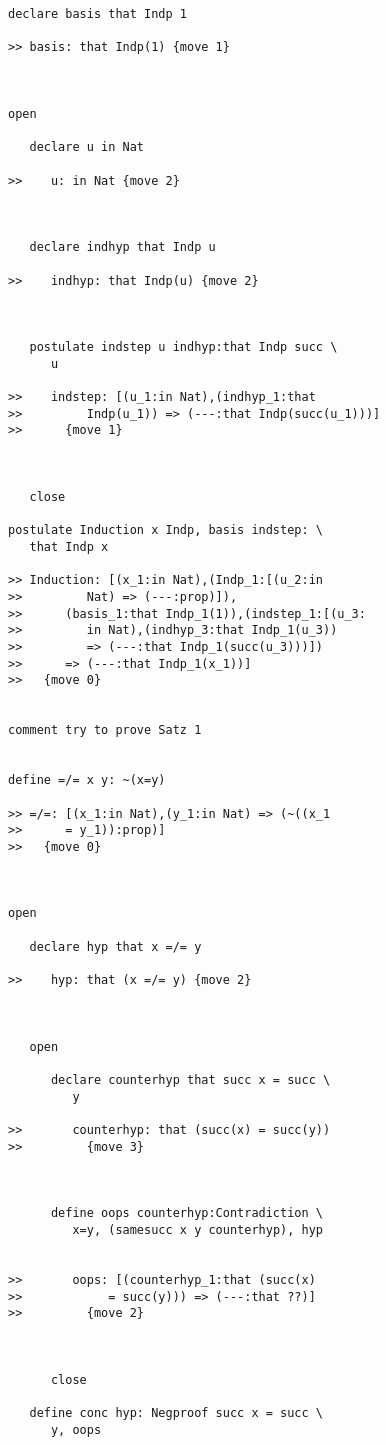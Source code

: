 \begin{verbatim}
declare basis that Indp 1

>> basis: that Indp(1) {move 1}



open

   declare u in Nat

>>    u: in Nat {move 2}



   declare indhyp that Indp u

>>    indhyp: that Indp(u) {move 2}



   postulate indstep u indhyp:that Indp succ \
      u

>>    indstep: [(u_1:in Nat),(indhyp_1:that
>>         Indp(u_1)) => (---:that Indp(succ(u_1)))]
>>      {move 1}



   close

postulate Induction x Indp, basis indstep: \
   that Indp x

>> Induction: [(x_1:in Nat),(Indp_1:[(u_2:in
>>         Nat) => (---:prop)]),
>>      (basis_1:that Indp_1(1)),(indstep_1:[(u_3:
>>         in Nat),(indhyp_3:that Indp_1(u_3))
>>         => (---:that Indp_1(succ(u_3)))])
>>      => (---:that Indp_1(x_1))]
>>   {move 0}


comment try to prove Satz 1


define =/= x y: ~(x=y)

>> =/=: [(x_1:in Nat),(y_1:in Nat) => (~((x_1
>>      = y_1)):prop)]
>>   {move 0}



open

   declare hyp that x =/= y

>>    hyp: that (x =/= y) {move 2}



   open

      declare counterhyp that succ x = succ \
         y

>>       counterhyp: that (succ(x) = succ(y))
>>         {move 3}



      define oops counterhyp:Contradiction \
         x=y, (samesucc x y counterhyp), hyp


>>       oops: [(counterhyp_1:that (succ(x)
>>            = succ(y))) => (---:that ??)]
>>         {move 2}



      close

   define conc hyp: Negproof succ x = succ \
      y, oops


\end{verbatim}
